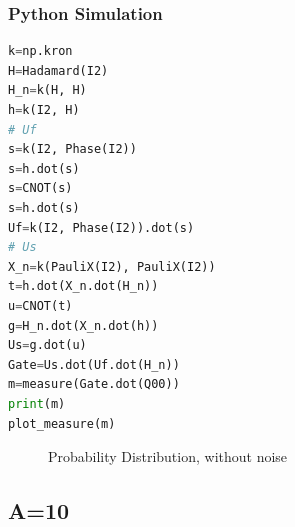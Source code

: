 \documentclass{article}
\begin{document}
\subsubsection{Python Simulation}
\begin{lstlisting}[frame=single, language=Python]
k=np.kron
H=Hadamard(I2)
H_n=k(H, H)
h=k(I2, H)
# Uf
s=k(I2, Phase(I2))
s=h.dot(s)
s=CNOT(s)
s=h.dot(s)
Uf=k(I2, Phase(I2)).dot(s)
# Us
X_n=k(PauliX(I2), PauliX(I2))
t=h.dot(X_n.dot(H_n))
u=CNOT(t)
g=H_n.dot(X_n.dot(h))
Us=g.dot(u)
Gate=Us.dot(Uf.dot(H_n))
m=measure(Gate.dot(Q00))
print(m)
plot_measure(m)
\end{lstlisting}
\begin{figure}[H]
\centering 
\noindent{}%
\caption{Probability Distribution, without noise}
\end{figure}
\subsection{A=10}
\end{document}
